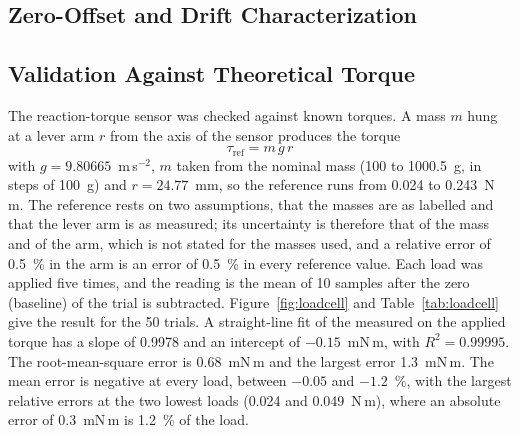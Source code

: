 
\subsection{Zero-Offset and Drift Characterization}
\label{subsec:agit-torque-drift}


\subsection{Validation Against Theoretical Torque}
\label{subsec:agit-torque-test}

The reaction-torque sensor was checked against known torques. A mass $m$ hung at a lever arm $r$ from the axis of the sensor produces the torque
\begin{equation}
    \tau_{\mathrm{ref}} = m\, g\, r
    \label{eq:tau-ref}
\end{equation}
with $g = 9.80665$~m\,s$^{-2}$, $m$ taken from the nominal mass (100 to 1000.5~g, in steps of 100~g) and $r = 24.77$~mm, so the reference runs from 0.024 to 0.243~N\,m. The reference rests on two assumptions, that the masses are as labelled and that the lever arm is as measured; its uncertainty is therefore that of the mass and of the arm, which is not stated for the masses used, and a relative error of 0.5~\% in the arm is an error of 0.5~\% in every reference value. %
Each load was applied five times, and the reading is the mean of 10 samples after the zero (baseline) of the trial is subtracted. Figure~\ref{fig:loadcell} and Table~\ref{tab:loadcell} give the result for the 50 trials. A straight-line fit of the measured on the applied torque has a slope of 0.9978 and an intercept of $-0.15$~mN\,m, with $R^{2} = 0.99995$. The root-mean-square error is 0.68~mN\,m and the largest error 1.3~mN\,m. The mean error is negative at every load, between $-0.05$ and $-1.2$~\%, with the largest relative errors at the two lowest loads (0.024 and 0.049~N\,m), where an absolute error of 0.3~mN\,m is 1.2~\% of the load.

